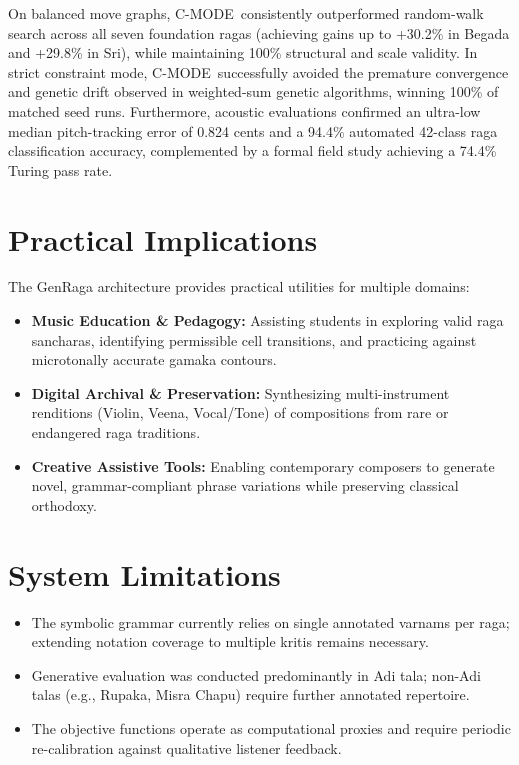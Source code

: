 \documentclass[12pt,a4paper]{report}
\newcommand{\cmode}{C-MODE}
\begin{document}
On balanced move graphs, \cmode\ consistently outperformed random-walk search across all seven foundation ragas (achieving gains up to +30.2\% in Begada and +29.8\% in Sri), while maintaining 100\% structural and scale validity. In strict constraint mode, \cmode\ successfully avoided the premature convergence and genetic drift observed in weighted-sum genetic algorithms, winning 100\% of matched seed runs. Furthermore, acoustic evaluations confirmed an ultra-low median pitch-tracking error of 0.824 cents and a 94.4\% automated 42-class raga classification accuracy, complemented by a formal field study achieving a 74.4\% Turing pass rate.

\section{Practical Implications}
The GenRaga architecture provides practical utilities for multiple domains:
\begin{itemize}
    \item \textbf{Music Education \& Pedagogy:} Assisting students in exploring valid raga sancharas, identifying permissible cell transitions, and practicing against microtonally accurate gamaka contours.
    \item \textbf{Digital Archival \& Preservation:} Synthesizing multi-instrument renditions (Violin, Veena, Vocal/Tone) of compositions from rare or endangered raga traditions.
    \item \textbf{Creative Assistive Tools:} Enabling contemporary composers to generate novel, grammar-compliant phrase variations while preserving classical orthodoxy.
\end{itemize}

\section{System Limitations}
\begin{itemize}
    \item The symbolic grammar currently relies on single annotated varnams per raga; extending notation coverage to multiple kritis remains necessary.
    \item Generative evaluation was conducted predominantly in Adi tala; non-Adi talas (e.g., Rupaka, Misra Chapu) require further annotated repertoire.
    \item The objective functions operate as computational proxies and require periodic re-calibration against qualitative listener feedback.
\end{itemize}
\end{document}
